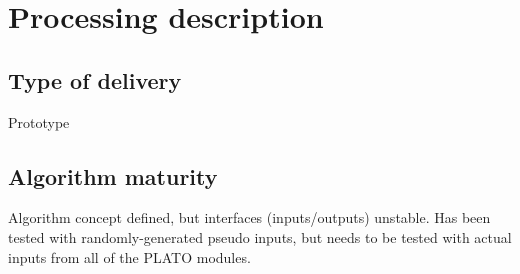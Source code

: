 \documentclass[a4paper, oneside, 11pt, article, english]{memoir}
\begin{document}
\clearpage
\chapter{Processing description}
\label{chap:processing}

\section{Type of delivery}
\label{sec:delivery}

Prototype

\iffalse
{
  \itshape

  The algorithms which are specified for the pipeline can come in different
  shapes and forms. We expect that the specifications will be delivered to the
  PDC under different forms, accordingly. Please indicate which one applies to
  the specified algorithm:

  \begin{itemize}
    \firmlist
  \item a legacy code. In that case, please contact WP12 office because some
    quality requirements are needed.
  \item a prototype. In that case, and in the first version of this document, no
    pseudo-code is to be provided.
  \item a pseudo-code. If no prototype exists, a workflow describing the
    algorithm main steps and a detailed pseudo-code is needed for
    implementation.
  \end{itemize}
}
\fi


\section{Algorithm maturity}
\label{sec:mature}

Algorithm concept defined, but interfaces (inputs/outputs) unstable. 
Has been tested with randomly-generated pseudo inputs, but needs to be tested with actual inputs from all of the PLATO modules. 

\iffalse
{
  \itshape

  Please specify the maturity level of the algorithm and do not hesitate to
  provide any further information on the current status of the algorithm. The
  convention for algorithm maturity is defined as:

  \begin{itemize}
    \firmlist
  \item algorithm not defined
  \item algorithm concept defined, but interfaces (inputs/outputs) unstable
  \item algorithm concept defined and interfaces (inputs/outputs) stable, but
    not all processing steps stable
  \item no change or only minor changes expected
  \end{itemize}

}
\fi
\end{document}
